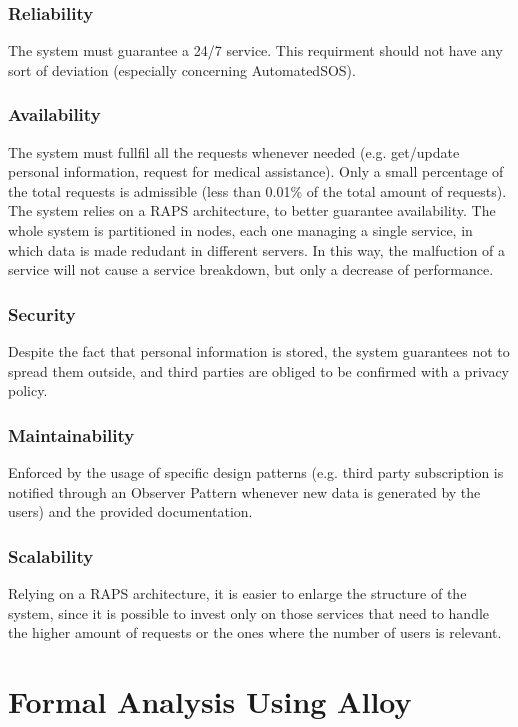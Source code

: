 \documentclass[12pt,a4paper]{article}
\begin{document}
	\subsubsection{Reliability}
	The system must guarantee a 24/7 service. This requirment should not have any sort of deviation (especially concerning AutomatedSOS).
	\subsubsection{Availability}
	The system must fullfil all the requests whenever needed (e.g. get/update personal information, request for medical assistance). Only a small percentage of the total requests is admissible (less than 0.01\% of the total amount of requests). The system relies on a RAPS architecture, to better guarantee availability. The whole system is partitioned in nodes, each one managing a single service, in which data is made redudant in different servers. In this way, the malfuction of a service will not cause a service breakdown, but only a decrease of performance.
	\subsubsection{Security}
	Despite the fact that personal information is stored, the system guarantees not to spread them outside, and third parties are obliged to be confirmed with a privacy policy.
	\subsubsection{Maintainability}
	Enforced by the usage of specific design patterns (e.g. third party subscription is notified through an Observer Pattern whenever new data is generated by the users) and the provided documentation.
	\subsubsection{Scalability}
	Relying on a RAPS architecture, it is easier to enlarge the structure of the system, since it is possible to invest only on those services that need to handle the higher amount of requests or the ones where the number of users is relevant.
	
	
	\newpage
	\section{Formal Analysis Using Alloy}

	\newpage
	
\end{document}
